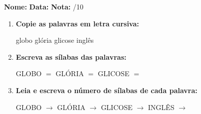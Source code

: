 \begin{exercicio}



\noindent\textbf{Nome:} \underline{\hspace{3.2cm}} \quad \textbf{Data:} \underline{\hspace{1.6cm}} \quad \textbf{Nota:} \underline{\hspace{0.9cm}}/10


\begin{enumerate}

  \item \textbf{Copie as palavras em letra cursiva:}
  \begin{center}
  globo \quad glória \quad glicose \quad inglês
  \end{center}
  \begin{center}
  \underline{\hspace{2.4cm}} \quad \underline{\hspace{2.4cm}} \quad \underline{\hspace{2.4cm}} \quad \underline{\hspace{2.4cm}}
  \end{center}

  \item \textbf{Escreva as sílabas das palavras:}
  \begin{center}
  GLOBO $=$ \underline{\hspace{1.5cm}} \underline{\hspace{1.5cm}} \quad GLÓRIA $=$ \underline{\hspace{1.5cm}} \underline{\hspace{1.5cm}} \quad GLICOSE $=$ \underline{\hspace{1.5cm}} \underline{\hspace{1.5cm}}
  \end{center}

  \item \textbf{Leia e escreva o número de sílabas de cada palavra:}
  \begin{center}
  GLOBO $\rightarrow$ \underline{\hspace{0.9cm}} \quad GLÓRIA $\rightarrow$ \underline{\hspace{0.9cm}} \quad GLICOSE $\rightarrow$ \underline{\hspace{0.9cm}} \quad INGLÊS $\rightarrow$ \underline{\hspace{0.9cm}}
  \end{center}


\end{enumerate}
\end{exercicio}
